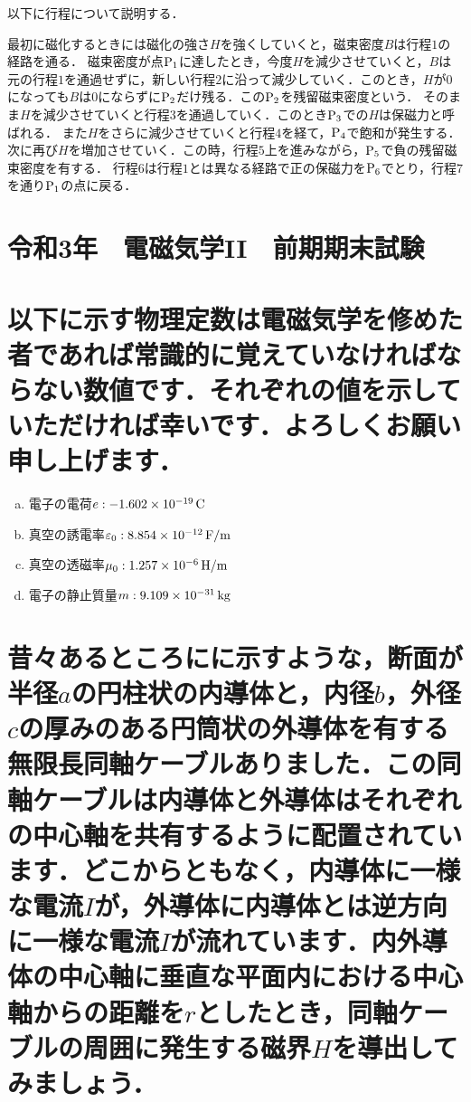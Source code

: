 \documentclass[dvipdfmx]{ujarticle}
\begin{document}
以下に行程について説明する．

最初に磁化するときには磁化の強さ$H$を強くしていくと，磁束密度$B$は行程$1$の経路を通る．
磁束密度が点$\rm{P_1}$に達したとき，今度$H$を減少させていくと，$B$は元の行程$1$を通過せずに，新しい行程$2$に沿って減少していく．このとき，$H$が$0$になっても$B$は$0$にならずに$\rm{P_2}$だけ残る．この$\rm{P_2}$を残留磁束密度という．
そのまま$H$を減少させていくと行程$3$を通過していく．このとき$\rm{P_3}$での$H$は保磁力と呼ばれる．
また$H$をさらに減少させていくと行程$4$を経て，$\rm{P_4}$で飽和が発生する．
次に再び$H$を増加させていく．この時，行程$5$上を進みながら，$\rm{P_5}$で負の残留磁束密度を有する．
行程$6$は行程$1$とは異なる経路で正の保磁力を$\rm{P_6}$でとり，行程$7$を通り$\rm{P_1}$の点に戻る．

\clearpage
\setcounter{section}{0}
\section*{令和3年　電磁気学II　前期期末試験}
\section{以下に示す物理定数は電磁気学を修めた者であれば常識的に覚えていなければならない数値です．それぞれの値を示していただければ幸いです．よろしくお願い申し上げます．}
\begin{enumerate}[(a)]
	\item 電子の電荷$e:-1.602 \times 10^{-19}\,\rm{C}$
	\item 真空の誘電率$\varepsilon_{0}:8.854 \times 10^{-12}\,\rm{F/m}$
	\item 真空の透磁率$\mu_{0}:1.257 \times 10^{-6}\,\rm{H/m}$
	\item 電子の静止質量$m:9.109\times 10^{-31}\,\rm{kg}$
\end{enumerate}

\section{昔々あるところにに示すような，断面が半径$a$の円柱状の内導体と，内径$b$，外径$c$の厚みのある円筒状の外導体を有する無限長同軸ケーブルありました．この同軸ケーブルは内導体と外導体はそれぞれの中心軸を共有するように配置されています．どこからともなく，内導体に一様な電流$I$が，外導体に内導体とは逆方向に一様な電流$I$が流れています．内外導体の中心軸に垂直な平面内における中心軸からの距離を$r$としたとき，同軸ケーブルの周囲に発生する磁界$H$を導出してみましょう．}
\end{document}
